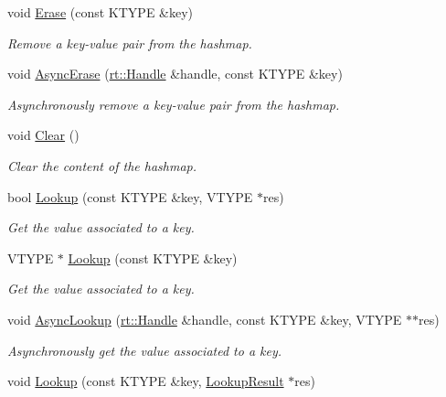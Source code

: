 \begin{DoxyCompactItemize}
\item 
void \hyperlink{classshad_1_1LocalHashmap_a5d57f63d0515acf2d53c99fb56eda93c}{Erase} (const K\-T\-Y\-P\-E \&key)
\begin{DoxyCompactList}\small\item\em Remove a key-\/value pair from the hashmap. \end{DoxyCompactList}\item 
void \hyperlink{classshad_1_1LocalHashmap_a78d00a5d4b2591cefcafb44247d9131d}{Async\-Erase} (\hyperlink{classshad_1_1rt_1_1Handle}{rt\-::\-Handle} \&handle, const K\-T\-Y\-P\-E \&key)
\begin{DoxyCompactList}\small\item\em Asynchronously remove a key-\/value pair from the hashmap. \end{DoxyCompactList}\item 
void \hyperlink{classshad_1_1LocalHashmap_a4e95baa9af6646d2c66adc1b8ae5781c}{Clear} ()
\begin{DoxyCompactList}\small\item\em Clear the content of the hashmap. \end{DoxyCompactList}\item 
bool \hyperlink{classshad_1_1LocalHashmap_a0365f5c68c75b04109639e8f65cc8eb0}{Lookup} (const K\-T\-Y\-P\-E \&key, V\-T\-Y\-P\-E $\ast$res)
\begin{DoxyCompactList}\small\item\em Get the value associated to a key. \end{DoxyCompactList}\item 
V\-T\-Y\-P\-E $\ast$ \hyperlink{classshad_1_1LocalHashmap_ae37645e79a683b4bc8c096a37cacf74d}{Lookup} (const K\-T\-Y\-P\-E \&key)
\begin{DoxyCompactList}\small\item\em Get the value associated to a key. \end{DoxyCompactList}\item 
void \hyperlink{classshad_1_1LocalHashmap_ab80af4eef1ce16673c1895bd6cd3951b}{Async\-Lookup} (\hyperlink{classshad_1_1rt_1_1Handle}{rt\-::\-Handle} \&handle, const K\-T\-Y\-P\-E \&key, V\-T\-Y\-P\-E $\ast$$\ast$res)
\begin{DoxyCompactList}\small\item\em Asynchronously get the value associated to a key. \end{DoxyCompactList}\item 
void \hyperlink{classshad_1_1LocalHashmap_a9bd1b3780c1c676ce8d5eae265030080}{Lookup} (const K\-T\-Y\-P\-E \&key, \hyperlink{structshad_1_1LocalHashmap_1_1LookupResult}{Lookup\-Result} $\ast$res)
$$
\end{DoxyCompactItemize}
